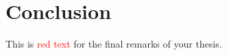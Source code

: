 \documentclass[../main.tex]{subfiles}
\begin{document}
\chapter{Conclusion}
\label{chap:conclusion}

This is \textcolor{red}{red text} for the final remarks of your thesis.
\end{document}
